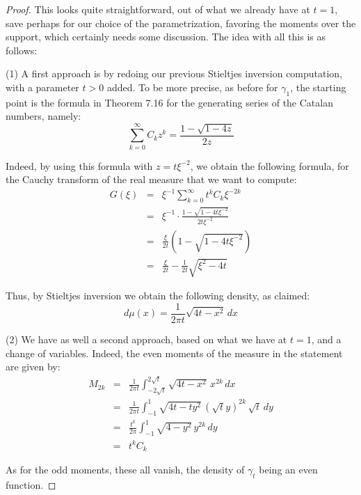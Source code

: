 \documentclass[12pt]{amsbook}
\begin{document}
\begin{proof}
This looks quite straightforward, out of what we already have at $t=1$, save perhaps for our choice of the parametrization, favoring the moments over the support, which certainly needs some discussion. The idea with all this is as follows:

\medskip

(1) A first approach is by redoing our previous Stieltjes inversion computation, with a parameter $t>0$ added. To be more precise, as before for $\gamma_1$, the starting point is the formula in Theorem 7.16 for the generating series of the Catalan numbers, namely:
$$\sum_{k=0}^\infty C_kz^k=\frac{1-\sqrt{1-4z}}{2z}$$

Indeed, by using this formula with $z=t\xi^{-2}$, we obtain the following formula, for the Cauchy transform of the real measure that we want to compute:
\begin{eqnarray*}
G(\xi)
&=&\xi^{-1}\sum_{k=0}^\infty t^kC_k\xi^{-2k}\\
&=&\xi^{-1}\cdot\frac{1-\sqrt{1-4t\xi^{-2}}}{2t\xi^{-2}}\\
&=&\frac{\xi}{2t}\left(1-\sqrt{1-4t\xi^{-2}}\right)\\
&=&\frac{\xi}{2t}-\frac{1}{2t}\sqrt{\xi^2-4t}
\end{eqnarray*}

Thus, by Stieltjes inversion we obtain the following density, as claimed:
$$d\mu(x)=\frac{1}{2\pi t}\sqrt{4t-x^2}\,dx$$

(2) We have as well a second approach, based on what we have at $t=1$, and a change of variables. Indeed, the even moments of the measure in the statement are given by:
\begin{eqnarray*}
M_{2k}
&=&\frac{1}{2\pi t}\int_{-2\sqrt{t}}^{2\sqrt{t}}\sqrt{4t-x^2}\,x^{2k}\,dx\\
&=&\frac{1}{2\pi t}\int_{-1}^1\sqrt{4t-ty^2}\,(\sqrt{t}y)^{2k}\,\sqrt{t}\,dy\\
&=&\frac{t^k}{2\pi}\int_{-1}^1\sqrt{4-y^2}\,y^{2k}\,dy\\
&=&t^kC_k
\end{eqnarray*}

As for the odd moments, these all vanish, the density of $\gamma_t$ being an even function.

\medskip


\end{proof}
\end{document}
